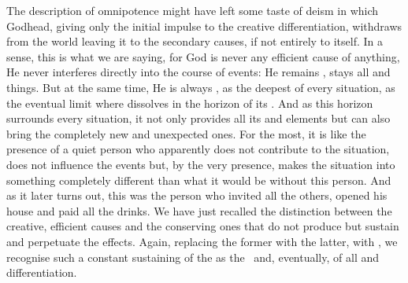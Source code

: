 

\label{adopenness} The description of omnipotence might
have left some taste of deism in which Godhead, giving only the initial impulse
to the creative differentiation, withdraws from the world leaving it to the
secondary causes, if not entirely to itself. In a sense, this is what we are
saying, for God is never any  efficient cause of anything, He never
interferes directly into the course of  events: He remains
, stays  all  and  things.
But at the same time, He is always , as the deepest  of
every situation, as the eventual limit where  dissolves in the
 horizon of its . And as this horizon surrounds
every situation, it not only provides all its  and 
elements but can also bring the completely new and unexpected ones.  For the
most, it is like the presence of a quiet person who apparently does not
contribute to the situation, does not influence the events but, by the very
presence, makes the situation into something completely different than what it
would be without this person. And as it later turns out, this was the person who
invited all the others, opened his house and paid all the drinks. We have just
recalled the distinction between the creative, efficient causes
and the conserving ones that do not produce but sustain and perpetuate the
effects. Again, replacing the former with
the latter,  with , we recognise such a constant
sustaining  of the  as the  \hoa\ and,
eventually, of all  and differentiation.

